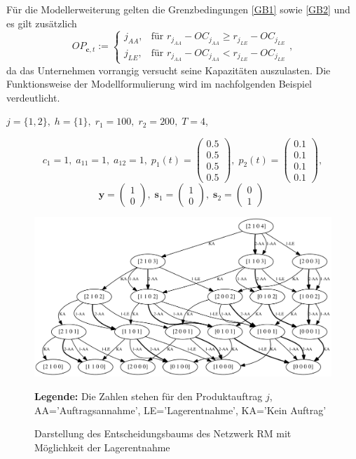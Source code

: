 Für die Modellerweiterung gelten die Grenzbedingungen \eqref{GB1} sowie \eqref{GB2} und es gilt zusätzlich
\begin{equation}\label{GB3}
     OP_{\textbf{c}, t}:=\left\{\begin{array}{ll} j_{AA}, & \text{für } r_{j_{AA}} - OC_{j_{AA}} \ge r_{j_{LE}} - OC_{j_{LE}}\\
         j_{LE}, & \text{für } r_{j_{AA}} - OC_{j_{AA}} < r_{j_{LE}} - OC_{j_{LE}}\end{array}\right. ,
\end{equation}
da das Unternehmen vorrangig versucht seine Kapazitäten auszulasten. Die Funktionsweise der Modellformulierung wird im nachfolgenden Beispiel verdeutlicht.
\begin{center}
$j = \{1, 2\}, \; h = \{1\}, \; r_{1} = 100, \; r_{2} = 200, \; T=4$,
\end{center}
\[
    c_{1}=1, \;
    a_{11}=1, \;
     a_{12}=1, \;
     p_{1}(t)=\begin{pmatrix} 0.5\\ 0.5\\ 0.5\\ 0.5  \end{pmatrix}, \;
     p_{2}(t)=\begin{pmatrix} 0.1\\ 0.1\\ 0.1\\ 0.1  \end{pmatrix},
  \]
  \[
    \textbf{y}=\begin{pmatrix} 1 \\ 0 \end{pmatrix}, \;
    \textbf{s}_1=\begin{pmatrix} 1 \\ 0 \end{pmatrix}, \;
     \textbf{s}_2=\begin{pmatrix} 0 \\ 1 \end{pmatrix} \;
  \]

\begin{figure}[h!]
  \begin{center}
    \includegraphics[width=130mm]{Bilder/Beispiel3.pdf}
    \caption{Darstellung des Entscheidungsbaums des Netzwerk RM mit Möglichkeit der Lagerentnahme}  \label{B3}
    {\footnotesize \textbf{Legende:} Die Zahlen stehen für den Produktauftrag $j$, AA='Auftragsannahme', LE='Lagerentnahme', KA='Kein Auftrag'} 
  \end{center}
\end{figure}

